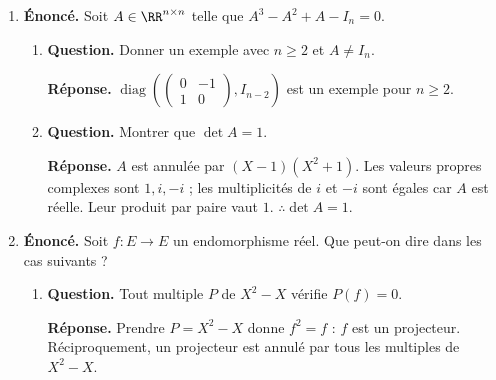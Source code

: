 \documentclass[12pt, a4paper]{article}
\begin{document}
\begin{enumerate}[label=9.\arabic*., start=94]
\begin{minipage}[t]{\linewidth}
\begin{enumerate}[\arabic*.]
  \item \textbf{Question.} Calculer $\chi_A(-2\cos\theta)$ et en déduire les valeurs propres de $A$.
\par\smallskip
\textbf{Réponse.} $\chi_A(-2\cos\theta)=(-1)^nD_n$.
        Ainsi les valeurs propres distinctes de $A$ sont
        $\lambda_k=2\cos(k\pi/(n+1))$, $1\leq k\leq n$.

  \item \textbf{Question.} Montrer que $2I_n-A$ et $2I_n+A$ ont des valeurs propres strictement positives.
\par\smallskip
\textbf{Réponse.} $-2<\lambda_k<2$, donc les valeurs propres $2\pm\lambda_k$ de $2I_n\pm A$ sont strictement positives.

\end{enumerate}
\end{minipage}

  \item \begin{minipage}[t]{\linewidth}\raggedright
\textbf{Énoncé.} Soit $A\in\RR^{n\times n}$ telle que $A^3-A^2+A-I_n=0$.

\begin{enumerate}[\arabic*.]
        \item \textbf{Question.} Donner un exemple avec $n\geq2$ et $A\neq I_n$.
\par\smallskip
\textbf{Réponse.} $\operatorname{diag}\left(\begin{pmatrix}0&-1\\1&0\end{pmatrix},I_{n-2}\right)$ est un exemple pour $n\geq2$.

  \item \textbf{Question.} Montrer que $\det A=1$.
\par\smallskip
\textbf{Réponse.} $A$ est annulée par $(X-1)(X^2+1)$.
        Les valeurs propres complexes sont $1,i,-i$ ; les multiplicités de $i$ et $-i$ sont égales car $A$ est réelle.
        Leur produit par paire vaut $1$.
        $\therefore\det A=1$.

\end{enumerate}
\end{minipage}

  \item \begin{minipage}[t]{\linewidth}\raggedright
\textbf{Énoncé.} Soit $f:E\to E$ un endomorphisme réel. Que peut-on dire dans les cas suivants ?

\begin{enumerate}[\arabic*.]
        \item \textbf{Question.} Tout multiple $P$ de $X^2-X$ vérifie $P(f)=0$.
\par\smallskip
\textbf{Réponse.} Prendre $P=X^2-X$ donne $f^2=f$ : $f$ est un projecteur.
        Réciproquement, un projecteur est annulé par tous les multiples de $X^2-X$.


\end{enumerate}
\end{minipage}
\end{enumerate}
\end{document}

